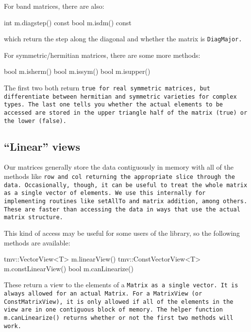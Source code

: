 For band matrices, there are also:
\begin{tmvcode}
int m.diagstep() const
bool m.isdm() const
\end{tmvcode}
which return the step along the diagonal and whether the matrix is \tt{DiagMajor}.

For symmetric/hermitian matrices, there are some more methods:
\begin{tmvcode}
bool m.isherm()
bool m.issym()
bool m.isupper()
\end{tmvcode}
The first two both return \tt{true} for real symmetric matrices, but 
differentiate between hermitian and symmetric varieties for complex types.
The last one tells you whether the actual elements to be accessed are stored
in the upper triangle half of the matrix (true) or the lower (false).

\subsection{``Linear'' views}
\label{LinearViews}

Our matrices generally store the data contiguously in memory with all of the 
methods like \tt{row} and \tt{col} returning the appropriate slice through the
data.  Occasionally, though, it can be useful to treat the whole matrix
as a single vector of elements.  We use this internally for implementing routines
like \tt{setAllTo} and matrix addition, among others.  These are faster than
accessing the data in ways that use the actual matrix structure.

This kind of access may be useful for some users of the library, 
so the following methods are available:
\begin{tmvcode}
tmv::VectorView<T> m.linearView()
tmv::ConstVectorView<T> m.constLinearView()
bool m.canLinearize()
\end{tmvcode}
These return a view to the elements of a \tt{Matrix} as a single vector.  
It is always allowed for an actual \tt{Matrix}.  For a \tt{MatrixView} 
(or \tt{ConstMatrixView}), it is only allowed if all of the elements in the 
view are in one contiguous block of memory.  The helper function 
\tt{m.canLinearize()} returns whether or not the first two methods will work.

